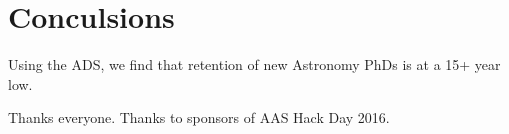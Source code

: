 \documentclass{emulateapj}
\begin{document}


\section{Conculsions}
Using the ADS, we find that retention of new Astronomy PhDs is at a 15+ year low.  


\acknowledgments
Thanks everyone. Thanks to sponsors of AAS Hack Day 2016. 



\end{document}
